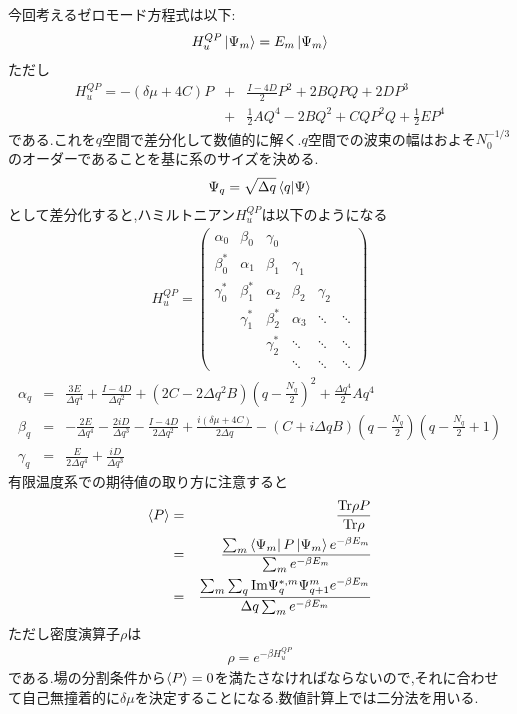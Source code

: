 \documentclass[10.5pt,a4paper]{jreport}
\begin{document}
今回考えるゼロモード方程式は以下:
\begin{eqnarray}
  H_u^{QP}\ket{\Psi_m} = E_m\ket{\Psi_m}
\end{eqnarray}
ただし
\begin{eqnarray}
  \nonumber  H_u^{QP} = -(\delta\mu + 4C)P &+& \frac{I-4D}{2}P^2 + 2BQPQ + 2DP^3\\
  &+& \frac{1}{2}AQ^4 -2BQ^2 + CQP^2Q + \frac{1}{2}EP^4
\end{eqnarray}
である.これを$q$空間で差分化して数値的に解く.$q$空間での波束の幅はおよそ$N_0^{-1/3}$のオーダーであることを基に系のサイズを決める.
\\
\begin{eqnarray}
  \Psi_q = \sqrt{\Delta q}\ev{q|\Psi}
\end{eqnarray}
として差分化すると,ハミルトニアン$H_u^{QP}$は以下のようになる
\begin{eqnarray}
  H_u^{QP} =
  \begin{pmatrix}
    \alpha_0 & \beta_0& \gamma_0& & & \\
    \beta_0^* & \alpha_1 & \beta_1 & \gamma_1 & & \\
    \gamma_0^* &\beta_1^* &\alpha_2 &\beta_2 &\gamma_2 &\\
    &\gamma_1^* & \beta_2^* & \alpha_3 & \ddots & \ddots\\
    & & \gamma_2^* & \ddots &\ddots &\ddots \\
    &&&\ddots &\ddots &\ddots 
  \end{pmatrix}
\end{eqnarray}
\begin{eqnarray}
  \alpha_q &=& \frac{3E}{\Delta q^4} + \frac{I-4D}{\Delta q^2} + (2C -2\Delta q^2B)(q-\frac{N_q}{2})^2 + \frac{\Delta q^4}{2}Aq^4 \\
  \beta_q &=& -\frac{2E}{\Delta q^4} - \frac{2iD}{\Delta q^3} - \frac{I-4D}{2\Delta q^2} + \frac{i(\delta\mu + 4C)}{2\Delta q} - (C + i\Delta qB)(q - \frac{N_q}{2})(q - \frac{N_q}{2}+1)\\
  \gamma_q &=& \frac{E}{2\Delta q^4} + \frac{iD}{\Delta q^3}
\end{eqnarray}
有限温度系での期待値の取り方に注意すると
\begin{eqnarray}
  \nonumber  \ev{P} &=& \frac{{\rm Tr}\rho P}{{\rm Tr}\rho}\\
  \nonumber &=& \frac{\sum_m\bra{\Psi_m} P \ket{\Psi_m}e^{-\beta E_m}}{\sum_me^{-\beta E_m}}\\
  &=& \frac{\sum_m\sum_q{\rm Im} \Psi_q^{*,m}\Psi_{q+1}^me^{-\beta E_m}}{\Delta q\sum_me^{-\beta E_m}}
\end{eqnarray}
ただし密度演算子$\rho$は
\begin{eqnarray}
  \rho = e^{-\beta H_u^{QP}}
\end{eqnarray}
である.場の分割条件から$\ev{P} = 0$を満たさなければならないので,それに合わせて自己無撞着的に$\delta\mu$を決定することになる.数値計算上では二分法を用いる.
\end{document}
